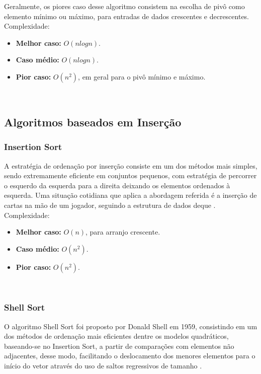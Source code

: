 \documentclass[conference,onecolumn]{IEEEtran}
\begin{document}
Geralmente, os piores caso desse algoritmo consistem na escolha de pivô como elemento mínimo ou máximo, para entradas de dados crescentes e decrescentes.\\

Complexidade:
\begin{itemize}
\item \textbf{Melhor caso:} $O (nlog n)$.
\item \textbf{Caso médio:} $O (nlog n)$.
\item \textbf{Pior caso:} $O (n^2)$, em geral para o pivô mínimo e máximo.
\end{itemize}


~\\
\subsection{Algoritmos baseados em Inserção}

\subsubsection{Insertion Sort}

A estratégia de ordenação por inserção consiste em um dos métodos mais simples, sendo extremamente eficiente em conjuntos pequenos, com estratégia de percorrer o esquerdo da esquerda para a direita deixando os elementos ordenados  à esquerda. Uma situação cotidiana que aplica a abordagem referida é a inserção de cartas na mão de um jogador, seguindo a estrutura de dados deque \cite{biggar}.\\

Complexidade:
\begin{itemize}
\item \textbf{Melhor caso:} $O (n)$, para arranjo crescente.
\item \textbf{Caso médio:} $O (n^2)$.
\item \textbf{Pior caso:} $O (n^2)$.
\end{itemize}

~\\
\subsubsection{Shell Sort}

O algoritmo Shell Sort foi proposto por Donald Shell em 1959, consistindo em um dos métodos de ordenação mais eficientes dentre os modelos quadráticos, baseando-se no Insertion Sort, a partir de comparações com elementos não adjacentes, desse modo, facilitando o deslocamento dos menores elementos para o início do vetor através do uso de saltos regressivos de tamanho \cite{ziviani}.
\end{document}
